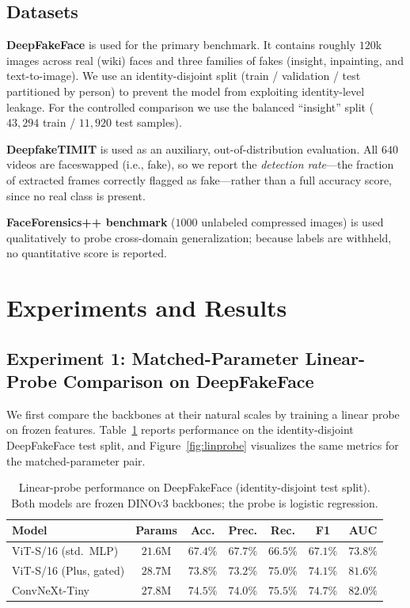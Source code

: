 \documentclass[11pt,a4paper]{article}
\begin{document}
\subsection{Datasets}
\textbf{DeepFakeFace} is used for the primary benchmark. It contains roughly $120$k images across
real (wiki) faces and three families of fakes (insight, inpainting, and text-to-image). We use an
identity-disjoint split (train / validation / test partitioned by person) to prevent the model
from exploiting identity-level leakage. For the controlled comparison we use the balanced
``insight'' split ($43{,}294$ train / $11{,}920$ test samples).

\textbf{DeepfakeTIMIT} is used as an auxiliary, out-of-distribution evaluation. All $640$ videos
are faceswapped (i.e., fake), so we report the \emph{detection rate}---the fraction of extracted
frames correctly flagged as fake---rather than a full accuracy score, since no real class is
present.

\textbf{FaceForensics++ benchmark} ($1000$ unlabeled compressed images) is used qualitatively to
probe cross-domain generalization; because labels are withheld, no quantitative score is reported.

\section{Experiments and Results}

\subsection{Experiment 1: Matched-Parameter Linear-Probe Comparison on DeepFakeFace}
We first compare the backbones at their natural scales by training a linear probe on frozen
features. Table~\ref{tab:deepfakeface} reports performance on the identity-disjoint DeepFakeFace
test split, and Figure~\ref{fig:linprobe} visualizes the same metrics for the matched-parameter
pair.

\begin{table}[H]
\centering
\caption{Linear-probe performance on DeepFakeFace (identity-disjoint test split). Both models
are frozen \textsc{DINOv3} backbones; the probe is logistic regression.}
\label{tab:deepfakeface}
\begin{tabular}{lcccccc}
\toprule
\textbf{Model} & \textbf{Params} & \textbf{Acc.} & \textbf{Prec.} & \textbf{Rec.} & \textbf{F1} & \textbf{AUC} \\
\midrule
ViT-S/16 (std.\ MLP)      & $21.6$M & $67.4\%$ & $67.7\%$ & $66.5\%$ & $67.1\%$ & $73.8\%$ \\
ViT-S/16 (Plus, gated)    & $28.7$M & $73.8\%$ & $73.2\%$ & $75.0\%$ & $74.1\%$ & $81.6\%$ \\
ConvNeXt-Tiny             & $27.8$M & $74.5\%$ & $74.0\%$ & $75.5\%$ & $74.7\%$ & $82.0\%$ \\
\bottomrule
\end{tabular}
\end{table}
\end{document}
